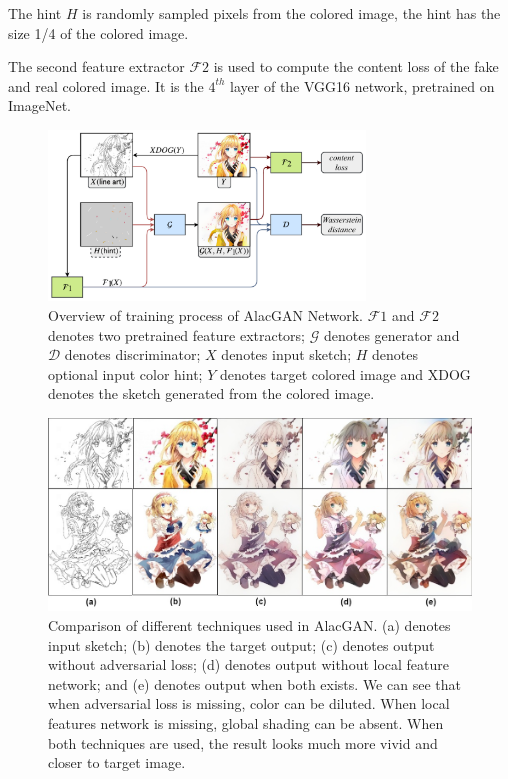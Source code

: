 The hint $H$ is randomly sampled pixels from the colored image, the hint has the size 1/4 of the colored image.

The second feature extractor $\mathcal{F}2$ is used to compute the content loss of the fake and real colored image. It is the $4^{th}$ layer of the VGG16 network, pretrained on ImageNet\cite{ImageNet}.

\begin{figure}
    \centering
    \includegraphics[width=0.75\textwidth]{images/colorization/alacgan_train.png}
    \caption{Overview of training process of AlacGAN Network. $\mathcal{F}1$ and $\mathcal{F}2$ denotes two pretrained feature extractors; $\mathcal{G}$ denotes generator and $\mathcal{D}$ denotes discriminator; $X$ denotes input sketch; $H$ denotes optional input color hint; $Y$ denotes target colored image and XDOG denotes the sketch generated from the colored image.} 
    \label{fig:alacgan_train}
\end{figure}

\begin{figure}
    \centering
    \includegraphics[width=1.0\textwidth]{images/colorization/alacgan_features.jpg}
    \caption{Comparison of different techniques used in AlacGAN. (a) denotes input sketch; (b) denotes the target output; (c) denotes output without adversarial loss; (d) denotes output without local feature network; and (e) denotes output when both exists. We can see that when adversarial loss is missing, color can be diluted. When local features network is missing, global shading can be absent. When both techniques are used, the result looks much more vivid and closer to target image.} 
    \label{fig:alacgan_features}
\end{figure}

